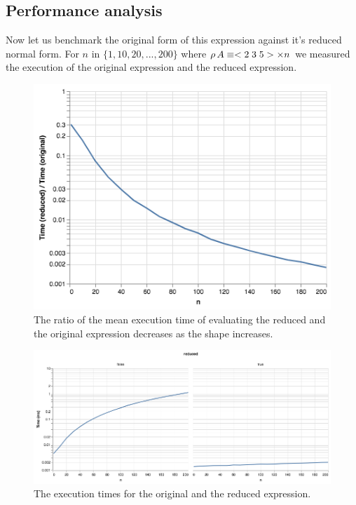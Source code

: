 \documentclass[a4paper,12pt]{article}
\begin{document}

 
\subsection{Performance analysis}

Now let us benchmark the original form of this expression against it's reduced normal form.
For $n$ in ${\{1, 10, 20, ..., 200\}}$ where $\rho\, A \equiv <2\;3\;5> \times n$ we measured the
execution of the original expression and the reduced expression.

\begin{figure}[h]
  \includegraphics[width=1\textwidth]{benchmarks/visualization-ratio.png}
  \caption{The ratio of the mean execution time of evaluating the reduced and the original expression decreases as the shape increases.}
  \label{fig:plot}
\end{figure}

\begin{figure}[h]
  \includegraphics[width=1\textwidth]{benchmarks/visualization-two-plots.png}
  \caption{The execution times for the original and the reduced expression.}
  \label{fig:plot}
\end{figure}
\end{document}
